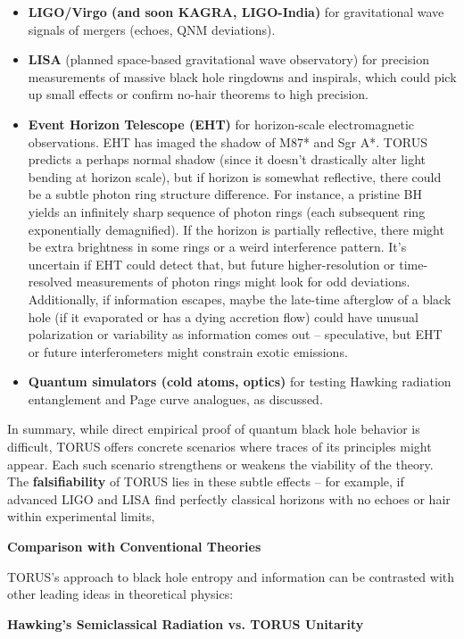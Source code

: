 \documentclass[]{article}
\begin{document}
\begin{itemize}
\item
  \textbf{LIGO/Virgo (and soon KAGRA, LIGO-India)} for gravitational
  wave signals of mergers (echoes, QNM deviations).
\item
  \textbf{LISA} (planned space-based gravitational wave observatory) for
  precision measurements of massive black hole ringdowns and inspirals,
  which could pick up small effects or confirm no-hair theorems to high
  precision.
\item
  \textbf{Event Horizon Telescope (EHT)} for horizon-scale
  electromagnetic observations. EHT has imaged the shadow of M87* and
  Sgr A*. TORUS predicts a perhaps normal shadow (since it doesn't
  drastically alter light bending at horizon scale), but if horizon is
  somewhat reflective, there could be a subtle photon ring structure
  difference. For instance, a pristine BH yields an infinitely sharp
  sequence of photon rings (each subsequent ring exponentially
  demagnified). If the horizon is partially reflective, there might be
  extra brightness in some rings or a weird interference pattern. It's
  uncertain if EHT could detect that, but future higher-resolution or
  time-resolved measurements of photon rings might look for odd
  deviations. Additionally, if information escapes, maybe the late-time
  afterglow of a black hole (if it evaporated or has a dying accretion
  flow) could have unusual polarization or variability as information
  comes out -- speculative, but EHT or future interferometers might
  constrain exotic emissions.
\item
  \textbf{Quantum simulators (cold atoms, optics)} for testing Hawking
  radiation entanglement and Page curve analogues, as discussed.
\end{itemize}

In summary, while direct empirical proof of quantum black hole behavior
is difficult, TORUS offers concrete scenarios where traces of its
principles might appear. Each such scenario strengthens or weakens the
viability of the theory. The \textbf{falsifiability} of TORUS lies in
these subtle effects -- for example, if advanced LIGO and LISA find
perfectly classical horizons with no echoes or hair within experimental
limits,

\textbf{Comparison with Conventional Theories}

TORUS's approach to black hole entropy and information can be contrasted
with other leading ideas in theoretical physics:

\textbf{Hawking's Semiclassical Radiation vs. TORUS Unitarity}
\end{document}
